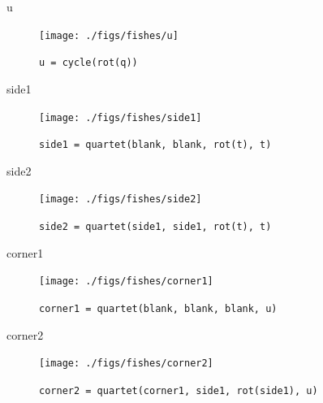 \documentclass{beamer}
\begin{document}
    \begin{frame}{u}

        \begin{figure}
            \centering
            \texttt{[image: ./figs/fishes/u]}
            \caption{\texttt{u = cycle(rot(q))}}
            \label{fig:u}
        \end{figure}

    \end{frame}

    \begin{frame}{side1}

        \begin{figure}
            \centering
            \texttt{[image: ./figs/fishes/side1]}
            \caption{\texttt{side1 = quartet(blank, blank, rot(t), t)}}
            \label{fig:side1}
        \end{figure}

    \end{frame}

   \begin{frame}{side2}

        \begin{figure}
            \centering
            \texttt{[image: ./figs/fishes/side2]}
            \caption{\texttt{side2 = quartet(side1, side1, rot(t), t)}}
            \label{fig:side2}
        \end{figure}

    \end{frame}

    \begin{frame}{corner1}

        \begin{figure}
            \centering
            \texttt{[image: ./figs/fishes/corner1]}
            \caption{\texttt{corner1 = quartet(blank, blank, blank, u)}}
            \label{fig:corner1}
        \end{figure}

    \end{frame}

    \begin{frame}{corner2}

        \begin{figure}
            \centering
            \texttt{[image: ./figs/fishes/corner2]}
            \caption{\footnotesize \texttt{corner2 = quartet(corner1, side1, rot(side1), u)}}
            \label{fig:corner2}
        \end{figure}

    \end{frame}
\end{document}
